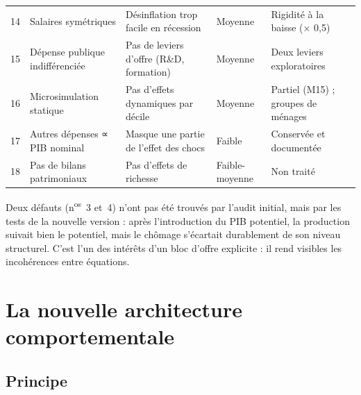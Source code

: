 \begin{table}[htbp]
\begin{tabularx}{\linewidth}{@{}rL L l L@{}}
14 & Salaires symétriques & Désinflation trop facile en récession & Moyenne & Rigidité à la baisse (× 0,5)\\
15 & Dépense publique indifférenciée & Pas de leviers d'offre (R\&D, formation) & Moyenne & Deux leviers exploratoires\\
16 & Microsimulation statique & Pas d'effets dynamiques par décile & Moyenne & Partiel (M15) ; groupes de ménages\\
17 & Autres dépenses ∝ PIB nominal & Masque une partie de l'effet des chocs & Faible & Conservée et documentée\\
18 & Pas de bilans patrimoniaux & Pas d'effets de richesse & Faible-moyenne & Non traité\\ \bottomrule
\end{tabularx}
\end{table}

Deux défauts (n\textsuperscript{os}~3 et~4) n'ont pas été trouvés par l'audit initial, mais par les tests de la
nouvelle version : après l'introduction du PIB potentiel, la production suivait bien le potentiel, mais le chômage
s'écartait durablement de son niveau structurel. C'est l'un des intérêts d'un bloc d'offre explicite : il rend
visibles les incohérences entre équations.

\chapter{La nouvelle architecture comportementale}\label{ch:architecture}

\section{Principe}

